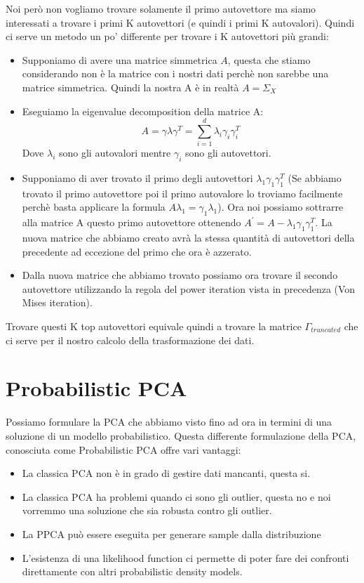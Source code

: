 \documentclass[14pt]{extreport}
\begin{document}
Noi però non vogliamo trovare solamente il primo autovettore ma siamo interessati a trovare i primi K autovettori (e quindi i primi K autovalori).
Quindi ci serve un metodo un po' differente per trovare i K autovettori più grandi:
\begin{itemize}
\item Supponiamo di avere una matrice simmetrica $A$, questa che stiamo considerando non è la matrice con i nostri dati perchè non sarebbe 
una matrice simmetrica. Quindi la nostra A è in realtà $A = \Sigma_X$
\item Eseguiamo la eigenvalue decomposition della matrice A: $$A = \gamma \lambda \gamma^T = \sum_{i=1}^d \lambda_i \gamma_i \gamma_i^T$$
Dove $\lambda_i$ sono gli autovalori mentre $\gamma_i$ sono gli autovettori.
\item Supponiamo di aver trovato il primo degli autovettori $\lambda_1 \gamma_1 \gamma_1^T$ (Se abbiamo trovato il primo autovettore poi il primo
autovalore lo troviamo facilmente perchè basta applicare la formula $A\lambda_1= \gamma_1 \lambda_1$).
Ora noi possiamo sottrarre alla matrice A questo primo autovettore ottenendo $A^{'} = A - \lambda_1 \gamma_1 \gamma_1^T$.
La nuova matrice che abbiamo creato avrà la stessa quantità di autovettori della precedente ad eccezione del primo che ora è azzerato.
\item Dalla nuova matrice che abbiamo trovato possiamo ora trovare il secondo autovettore utilizzando la regola del power iteration vista in precedenza
(Von Mises iteration).
\end{itemize}

Trovare questi K top autovettori equivale quindi a trovare la matrice $\Gamma_{truncated}$ che ci serve per il nostro calcolo
della trasformazione dei dati.

\section{Probabilistic PCA}

Possiamo formulare la PCA che abbiamo visto fino ad ora in termini di una soluzione di un modello probabilistico.
Questa differente formulazione della PCA, conosciuta come Probabilistic PCA offre vari vantaggi:
\begin{itemize}
	\item La classica PCA non è in grado di gestire dati mancanti, questa si.
	\item La classica PCA ha problemi quando ci sono gli outlier, questa no e noi vorremmo una soluzione che sia robusta contro gli outlier.
	\item La PPCA può essere eseguita per generare sample dalla distribuzione
	\item L'esistenza di una likelihood function ci permette di poter fare dei confronti direttamente con altri probabilistic density models.
\end{itemize}
\end{document}
